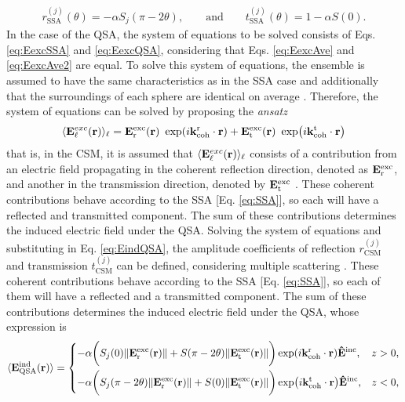 %
\begin{align}
	r^{(j)}_\text{SSA}(\theta) = -\alpha   S_j(\pi-2\theta), \qquad\text{and}\qquad t^{(j)}_\text{SSA}(\theta) = 1 - \alpha S(0).
\end{align}%
%
In the case of the QSA, the system of equations to be solved consists of Eqs. \eqref{eq:EexcSSA} and \eqref{eq:EexcQSA}, considering that Eqs. \eqref{eq:EexcAve} and \eqref{eq:EexcAve2} are equal. To solve this system of equations, the ensemble is assumed to have the same characteristics as in the SSA case and additionally that the surroundings of each sphere are identical on average \cite{garcia2012multiple}. Therefore, the system of equations can be solved by proposing the \textit{ansatz}
%
\begin{align}
	\langle\vb{E}^{exc}_\ell(\vb{r}) \rangle_\ell =
	\vb{E}^\text{exc}_\text{r}(\vb{r})\ \exp(i\vb{k}^\text{r}_\text{coh}\cdot\vb{r}) +
	\vb{E}^\text{exc}_\text{t}(\vb{r})\ \exp(i\vb{k}^\text{t}_\text{coh}\cdot\vb{r})
\end{align}
%
that is, in the CSM, it is assumed that $\langle\vb{E}^{exc}_\ell (\vb{r})\rangle_\ell$ consists of a contribution from an electric field propagating in the coherent reflection direction, denoted as $\vb{E}^\text{exc}_\text{r}$, and another in the transmission direction, denoted by $\vb{E}^\text{exc}_\text{t}$ \cite{garcia2012multiple}. These coherent contributions behave according to the SSA [Eq. \eqref{eq:SSA}], so each will have a reflected and transmitted component. The sum of these contributions determines the induced electric field under the QSA. Solving the system of equations and substituting in Eq. \eqref{eq:EindQSA}, the amplitude coefficients of reflection $r^{(j)}_\text{CSM}$ and transmission $t^{(j)}_\text{CSM}$ can be defined, considering multiple scattering \cite{garcia2012multiple,barrera_coherent_2003}. These coherent contributions behave according to the SSA [Eq. \eqref{eq:SSA}], so each of them will have a reflected and a transmitted component. The sum of these contributions determines the induced electric field under the QSA, whose expression is
%
\begin{align}
	\langle \vb{E}_\text{QSA}^\text{ind}(\vb{r})\rangle =
	\begin{dcases}
		-\alpha \bigg( S_j(0) \norm{\vb{E}^\text{exc}_\text{r}(\vb{r})} +  S(\pi-2\theta)\norm{\vb{E}^\text{exc}_\text{t}(\vb{r})}\bigg)
		\exp(i\vb{k}^\text{r}_\text{coh}\cdot\vb{r}) \vu{E}^\text{inc}, & z > 0, \\
		-\alpha \bigg( S_j(\pi-2\theta) \norm{\vb{E}^\text{exc}_\text{r}(\vb{r})} + S(0)\norm{\vb{E}^\text{exc}_\text{t}(\vb{r})}\bigg)
		\exp(i\vb{k}^\text{t}_\text{coh}\cdot\vb{r}) \vu{E}^\text{inc},  & z < 0, \\
	\end{dcases}
	\label{eq:EindQSA}
\end{align}
